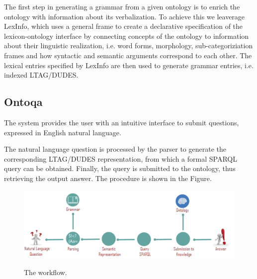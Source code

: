 The first step in generating a grammar from a given ontology is to enrich the ontology with information about its verbalization. To achieve this we leaverage LexInfo, which uses a general frame to create a declarative specification of the lexicon-ontology interface by connecting concepts of the ontology to information about their linguistic realization, i.e. word forms, morphology, sub-categoriziation frames and how syntactic and semantic arguments correspond to each other. The lexical entries specified by LexInfo are then used to generate grammar entries, i.e. indexed LTAG/DUDES.

\subsection{Ontoqa}
The system provides the user with an intuitive interface to submit questions, expressed in English natural language.

The natural language question is processed by the parser to generate the corresponding LTAG/DUDES representation, from which a formal SPARQL query can be obtained.
Finally, the query is submitted to the ontology, thus retrieving the output answer.
The procedure is shown in the Figure.







\begin{figure}[H]
   \centering
    \includegraphics[scale=0.5]{./fig/ontoqa}
    \label{fig:ontoqa}
    \caption{The workflow.}
\end{figure}